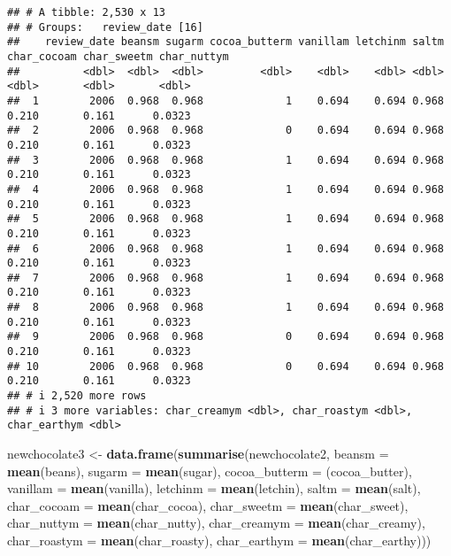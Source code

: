 \documentclass[
]{article}
\newenvironment{Shaded}{\begin{snugshade}}{\end{snugshade}}
\newcommand{\AttributeTok}[1]{\textcolor[rgb]{0.13,0.29,0.53}{#1}}
\newcommand{\FunctionTok}[1]{\textcolor[rgb]{0.13,0.29,0.53}{\textbf{#1}}}
\newcommand{\NormalTok}[1]{#1}
\newcommand{\OtherTok}[1]{\textcolor[rgb]{0.56,0.35,0.01}{#1}}
\begin{document}
\begin{verbatim}
## # A tibble: 2,530 x 13
## # Groups:   review_date [16]
##    review_date beansm sugarm cocoa_butterm vanillam letchinm saltm char_cocoam char_sweetm char_nuttym
##          <dbl>  <dbl>  <dbl>         <dbl>    <dbl>    <dbl> <dbl>       <dbl>       <dbl>       <dbl>
##  1        2006  0.968  0.968             1    0.694    0.694 0.968       0.210       0.161      0.0323
##  2        2006  0.968  0.968             0    0.694    0.694 0.968       0.210       0.161      0.0323
##  3        2006  0.968  0.968             1    0.694    0.694 0.968       0.210       0.161      0.0323
##  4        2006  0.968  0.968             1    0.694    0.694 0.968       0.210       0.161      0.0323
##  5        2006  0.968  0.968             1    0.694    0.694 0.968       0.210       0.161      0.0323
##  6        2006  0.968  0.968             1    0.694    0.694 0.968       0.210       0.161      0.0323
##  7        2006  0.968  0.968             1    0.694    0.694 0.968       0.210       0.161      0.0323
##  8        2006  0.968  0.968             1    0.694    0.694 0.968       0.210       0.161      0.0323
##  9        2006  0.968  0.968             0    0.694    0.694 0.968       0.210       0.161      0.0323
## 10        2006  0.968  0.968             0    0.694    0.694 0.968       0.210       0.161      0.0323
## # i 2,520 more rows
## # i 3 more variables: char_creamym <dbl>, char_roastym <dbl>, char_earthym <dbl>
\end{verbatim}

\begin{Shaded}
\begin{Highlighting}[]
\NormalTok{newchocolate3 }\OtherTok{\textless{}{-}} \FunctionTok{data.frame}\NormalTok{(}\FunctionTok{summarise}\NormalTok{(newchocolate2, }\AttributeTok{beansm =} \FunctionTok{mean}\NormalTok{(beans), }\AttributeTok{sugarm =} \FunctionTok{mean}\NormalTok{(sugar), }\AttributeTok{cocoa\_butterm =}\NormalTok{ (cocoa\_butter), }\AttributeTok{vanillam =} \FunctionTok{mean}\NormalTok{(vanilla), }\AttributeTok{letchinm =} \FunctionTok{mean}\NormalTok{(letchin), }\AttributeTok{saltm =} \FunctionTok{mean}\NormalTok{(salt), }\AttributeTok{char\_cocoam =} \FunctionTok{mean}\NormalTok{(char\_cocoa), }\AttributeTok{char\_sweetm =} \FunctionTok{mean}\NormalTok{(char\_sweet), }\AttributeTok{char\_nuttym =} \FunctionTok{mean}\NormalTok{(char\_nutty), }\AttributeTok{char\_creamym =} \FunctionTok{mean}\NormalTok{(char\_creamy), }\AttributeTok{char\_roastym =} \FunctionTok{mean}\NormalTok{(char\_roasty), }\AttributeTok{char\_earthym =} \FunctionTok{mean}\NormalTok{(char\_earthy)))}
\end{Highlighting}
\end{Shaded}
\end{document}
